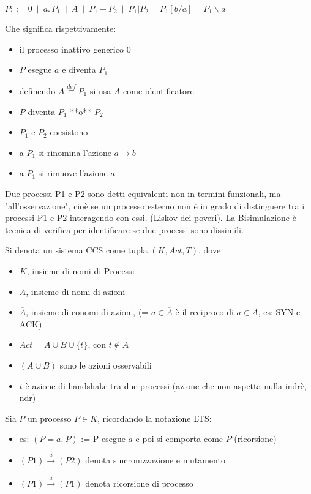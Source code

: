 $
P ::= 0 \,\,\,
  | \,\,\, a. \, P_{1} \,\,\,
  | \,\,\, A\,\,\,
  | \,\,\, P_{1} + P_{2} \,\,\,
  | \,\,\, P_{1} | P_{2} \,\,\,
  | \,\,\, P_{1} [b/a] \,\,\,
  | \,\,\, P_{1} {\backslash }a \,\,\,
$

Che significa rispettivamente:
\begin{itemize}
  \item il processo inattivo generico $0$
  \item $P$ esegue $a$ e diventa $P_1$
  \item definendo $A \stackrel{def}{\equiv} P_1$ si usa $A$ come identificatore
  \item $P$ diventa $P_1$ **o** $P_2$
  \item $P_1$ e $P_2$ coesistono
  \item a $P_1$ si rinomina l'azione $a \rightarrow b$
  \item a $P_1$ si rimuove l'azione $a$
\end{itemize}

Due processi P1 e P2 sono detti equivalenti non in termini funzionali, ma "all'osservazione", cio\`e se un processo esterno non \`e in grado di distinguere tra i processi P1 e P2 interagendo con essi. (Liskov dei poveri). La Bisimulazione \`e tecnica di verifica per identificare se due processi sono dissimili.

Si denota un sistema CCS come tupla $(K, Act, T)$, dove
\begin{itemize}
  \item $K$, insieme di nomi di Processi
  \item $A$, insieme di nomi di azioni
  \item $\overline A$, insieme di conomi di azioni, (= $\overline a \in \overline A$ \`e il reciproco di $a \in A$, es: SYN e ACK)
  \item $Act = A \cup B \cup \{t\}$, con $t \not \in A$
  \item $(A \cup B)$ sono le azioni osservabili
  \item $t$ \`e azione di handshake tra due processi (azione che non aspetta nulla indr\`e, ndr)
\end{itemize}

Sia $P$ un processo $P \in K$, ricordando la notazione LTS:
\begin{itemize}
  \item es: $(P = a . \ P)$ := P esegue $a$ e poi si comporta come $P$ (ricorsione)
  \item $(P1) \xrightarrow[]{a} (P2)$ denota sincronizzazione e mutamento
  \item $(P1) \xrightarrow[]{a} (P1)$ denota ricorsione di processo
\end{itemize}

